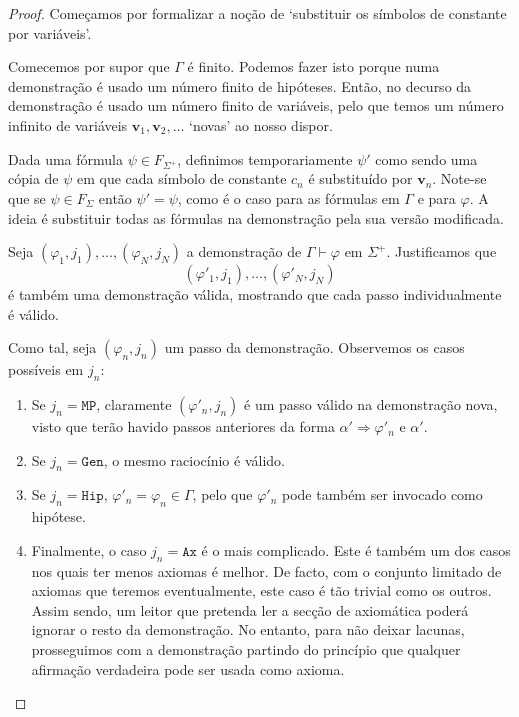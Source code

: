 \documentclass{report}
\theoremstyle{definition}
\theoremstyle{remark}
\renewcommand{\bf}[1]{\mathbf{#1}}
\newcommand{\imply}{\mathbin{\Rightarrow}}
\begin{document}
	\begin{proof}
	Começamos por formalizar a noção de `substituir os símbolos de constante por variáveis'.
	
	Comecemos por supor que $\Gamma$ é finito. Podemos fazer isto porque numa demonstração é usado um número finito de hipóteses. Então, no decurso da demonstração é usado um número finito de variáveis, pelo que temos um número infinito de variáveis $\bf v_1, \bf v_2, \dots$ `novas' ao nosso dispor.
	
	Dada uma fórmula $\psi \in F_{\Sigma^+}$, definimos temporariamente $\psi'$ como sendo uma cópia de $\psi$ em que cada símbolo de constante $c_n$ é substituído por $\bf v_n$. Note-se que se $\psi \in F_\Sigma$ então $\psi' = \psi$, como é o caso para as fórmulas em $\Gamma$ e para $\varphi$. A ideia é substituir todas as fórmulas na demonstração pela sua versão modificada.
	
	Seja $(\varphi_1, j_1), \dots, (\varphi_N, j_N)$ a demonstração de $\Gamma \vdash \varphi$ em $\Sigma^+$. Justificamos que
	\[(\varphi'_1, j_1), \dots, (\varphi'_N, j_N)\]
	é também uma demonstração válida, mostrando que cada passo individualmente é válido.
	
	Como tal, seja $(\varphi_n, j_n)$ um passo da demonstração. Observemos os casos possíveis em $j_n$:
	
	\begin{enumerate}
	\item Se $j_n = \mathtt{MP}$, claramente $(\varphi'_n, j_n)$ é um passo válido na demonstração nova, visto que terão havido passos anteriores da forma $\alpha' \imply \varphi'_n$ e $\alpha'$.
	
	\item Se $j_n = \mathtt{Gen}$, o mesmo raciocínio é válido.
	
	\item Se $j_n = \mathtt{Hip}$, $\varphi'_n = \varphi_n \in \Gamma$, pelo que $\varphi'_n$ pode também ser invocado como hipótese.
	
	\item Finalmente, o caso $j_n = \mathtt{Ax}$ é o mais complicado. Este é também um dos casos nos quais ter menos axiomas é melhor. De facto, com o conjunto limitado de axiomas que teremos eventualmente, este caso é tão trivial como os outros. Assim sendo, um leitor que pretenda ler a secção de axiomática poderá ignorar o resto da demonstração. No entanto, para não deixar lacunas, prosseguimos com a demonstração partindo do princípio que qualquer afirmação verdadeira pode ser usada como axioma.
	

\end{enumerate}
\end{proof}
\end{document}
